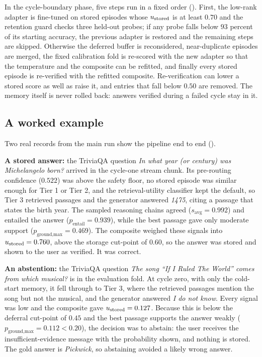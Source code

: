 In the cycle-boundary phase, five steps run in a fixed order (). First, the low-rank adapter is fine-tuned on stored episodes whose $u_{\text{stored}}$ is at least $0.70$ and the retention guard checks three held-out probes; if any probe falls below $93$ percent of its starting accuracy, the previous adapter is restored and the remaining steps are skipped. Otherwise the deferred buffer is reconsidered, near-duplicate episodes are merged, the fixed calibration fold is re-scored with the new adapter so that the temperature and the composite can be refitted, and finally every stored episode is re-verified with the refitted composite. Re-verification can lower a stored score as well as raise it, and entries that fall below $0.50$ are removed. The memory itself is never rolled back: answers verified during a failed cycle stay in it.



\subsection{A worked example}
\label{sec:overview-worked-example}

Two real records from the main run show the pipeline end to end ().

\textbf{A stored answer:} the TriviaQA question \emph{In what year (or century) was Michelangelo born?} arrived in the cycle-one stream chunk. Its pre-routing confidence ($0.522$) was above the safety floor, no stored episode was similar enough for Tier 1 or Tier 2, and the retrieval-utility classifier kept the default, so Tier 3 retrieved passages and the generator answered \emph{1475}, citing a passage that states the birth year. The sampled reasoning chains agreed ($s_{\text{avg}} = 0.992$) and entailed the answer ($p_{\text{entail}} = 0.939$), while the best passage gave only moderate support ($p_{\text{ground,max}} = 0.469$). The composite weighed these signals into $u_{\text{stored}} = 0.760$, above the storage cut-point of $0.60$, so the answer was stored and shown to the user as verified. It was correct.

\textbf{An abstention:} the TriviaQA question \emph{The song ``If I Ruled The World'' comes from which musical?} is in the evaluation fold. At cycle zero, with only the cold-start memory, it fell through to Tier 3, where the retrieved passages mention the song but not the musical, and the generator answered \emph{I do not know}. Every signal was low and the composite gave $u_{\text{stored}} = 0.127$. Because this is below the deferral cut-point of $0.45$ and the best passage supports the answer weakly ($p_{\text{ground,max}} = 0.112 < 0.20$), the decision was to abstain: the user receives the insufficient-evidence message with the probability shown, and nothing is stored. The gold answer is \emph{Pickwick}, so abstaining avoided a likely wrong answer.

